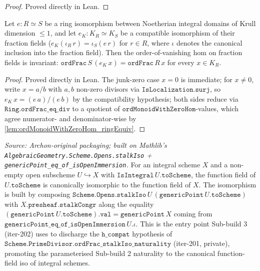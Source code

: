 \begin{proof}
  Proved directly in Lean.
\end{proof}
\begin{lemma}

  \label{lem:ordFrac_ringEquiv}
  Let \(e \colon R \simeq S\) be a ring isomorphism between Noetherian
  integral domains of Krull dimension \(\leq 1\), and let
  \(e_K \colon K_R \simeq K_S\) be a compatible isomorphism of their fraction
  fields (\(e_K(\iota_R\,r) = \iota_S(e\,r)\) for \(r \in R\), where
  \(\iota\) denotes the canonical inclusion into the fraction field). Then the
  order-of-vanishing hom on fraction fields is invariant:
  \(\texttt{ordFrac}\,S\,(e_K\,x) = \texttt{ordFrac}\,R\,x\) for every
  \(x \in K_R\).
\end{lemma}
\begin{proof}
  Proved directly in Lean. The junk-zero case \(x = 0\) is immediate; for
  \(x \neq 0\), write \(x = a/b\) with \(a, b\) non-zero divisors via
  \(\texttt{IsLocalization.surj}\), so \(e_K\,x = (e\,a)/(e\,b)\) by the
  compatibility hypothesis; both sides reduce via
  \(\texttt{Ring.ordFrac\_eq\_div}\) to a quotient of
  \(\texttt{ordMonoidWithZeroHom}\)-values, which agree numerator- and
  denominator-wise by \ref{lem:ordMonoidWithZeroHom_ringEquiv}.
\end{proof}
\begin{definition}
  \label{def:functionFieldIso}
  \textit{Source: Archon-original packaging; built on Mathlib's
  \texttt{AlgebraicGeometry.Scheme.Opens.stalkIso} +
  \texttt{genericPoint\_eq\_of\_isOpenImmersion}.}
  For an integral scheme \(X\) and a non-empty open subscheme
  \(U \hookrightarrow X\) with \(\texttt{IsIntegral}\,U.\texttt{toScheme}\),
  the function field of \(U.\texttt{toScheme}\) is canonically isomorphic
  to the function field of \(X\). The isomorphism is built by composing
  \(\texttt{Scheme.Opens.stalkIso}\,U\,(\texttt{genericPoint}\,U.\texttt{toScheme})\)
  with \(X.\texttt{presheaf.stalkCongr}\) along the equality
  \((\texttt{genericPoint}\,U.\texttt{toScheme}).\texttt{val}
   = \texttt{genericPoint}\,X\)
  coming from \(\texttt{genericPoint\_eq\_of\_isOpenImmersion}\,U.\iota\).
  This is the entry point Sub-build 3 (iter-202) uses to discharge
  the \(\texttt{h\_compat}\) hypothesis of
  \(\texttt{Scheme.PrimeDivisor.ordFrac\_stalkIso\_naturality}\)
  (iter-201, private), promoting the parameterised Sub-build 2 naturality
  to the canonical function-field iso of integral schemes.
\end{definition}

